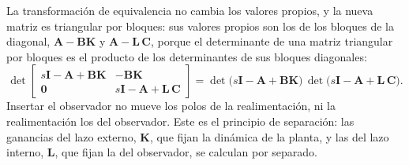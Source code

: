 La transformación de equivalencia no cambia los valores propios, y la nueva
matriz es triangular por bloques: sus valores propios son los de los bloques de
la diagonal, $\mathbf{A} - \mathbf{B}\mathbf{K}$ y $\mathbf{A} - \mathbf{L}\,\mathbf{C}$,
porque el determinante de una matriz triangular por bloques es el producto de los
determinantes de sus bloques diagonales:
\begin{equation}
\det\begin{bmatrix}
s\mathbf{I} - \mathbf{A} + \mathbf{B}\mathbf{K} & -\mathbf{B}\mathbf{K} \\
\mathbf{0} & s\mathbf{I} - \mathbf{A} + \mathbf{L}\,\mathbf{C}
\end{bmatrix}
= \det\bigl(s\mathbf{I} - \mathbf{A} + \mathbf{B}\mathbf{K}\bigr)\,
  \det\bigl(s\mathbf{I} - \mathbf{A} + \mathbf{L}\,\mathbf{C}\bigr).
\end{equation}
Insertar el observador no mueve los polos de la realimentación, ni la
realimentación los del observador. Este es el principio de separación: las
ganancias del lazo externo, $\mathbf{K}$, que fijan la dinámica de la planta, y
las del lazo interno, $\mathbf{L}$, que fijan la del observador, se calculan por
separado.

